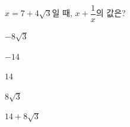 $x=7+4\sqrt{3}$일 때, $x+\dfrac{1}{x}$의 값은?
\begin{choices32}{\rule[-3ex]{0pt}{8ex}$-8\sqrt{3}$}{\rule[-3ex]{0pt}{8ex}$-14$}{\rule[-3ex]{0pt}{8ex}$14$}{\rule[-3ex]{0pt}{8ex}$8\sqrt{3}$}{\rule[-3ex]{0pt}{8ex}$14+8\sqrt{3}$}\end{choices32}
